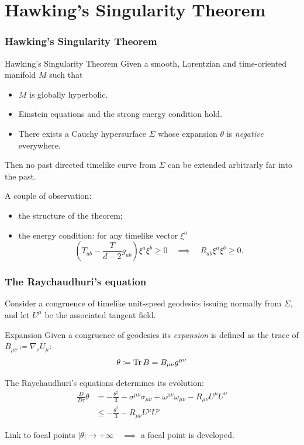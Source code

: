 \documentclass[]{beamer}
\begin{document}
\section{Hawking's Singularity Theorem}
\begin{frame}
	\frametitle{Hawking's Singularity Theorem}
	\begin{theoblock}{Hawking's Singularity Theorem \cite{wald2010general}}
		Given a smooth, Lorentzian and time-oriented manifold \(M\) such that 
		\begin{itemize}
			\item \(M\) is globally hyperbolic.
			\item Einstein equations and the strong energy condition hold.
			\item There exists a Cauchy hypersurface \(\Sigma\) whose expansion \(\theta\) is \emph{negative} everywhere.
		\end{itemize}
	Then no past directed timelike curve from \(\Sigma\) can be extended arbitrarly far into the past.
	\end{theoblock}

	\pause
	A couple of observation:
	\begin{itemize}
		\item<2-> the structure of the theorem;
		\item<3-> the energy condition: for any timelike vector \(\xi^a\) 
		{\small
			\[
		\left(T_{ab} - \frac{T}{d - 2}g_{ab}\right) \xi^a \xi^b \ge 0 \quad \implies \quad R_{ab} \xi^a \xi^b \ge 0.
		\]}
	\end{itemize}

\end{frame}
\begin{frame}
	\frametitle{The Raychaudhuri's equation}
	Consider a congruence of timelike unit-speed geodesics issuing normally from \(\Sigma\), and let \(U^{\mu}\) be the associated tangent field.
	\begin{defblock}{Expansion}
		Given a congruence of geodesics its \emph{expansion} is defined as the trace of \(B_{\mu\nu} \coloneqq \nabla_{\nu}U_{\mu}\):
		\[
		\theta \coloneqq \operatorname{Tr} B = B_{\mu\nu}g^{\mu\nu}
		\]
	\end{defblock}
\pause
The Raychaudhuri's equations determines its evolution:
{\small
\begin{align*}
	\frac{D}{D\tau} \theta &= -\frac{\theta^2}{3} -\sigma^{\mu\nu}\sigma_{\mu\nu} + \omega^{\mu\nu}\omega_{\mu\nu} - R_{\mu\nu}U^{\mu}U^{\nu} \\
	&\le -\frac{\theta^2}{3} - R_{\mu\nu}U^{\mu}U^{\nu}
\end{align*}}
\vskip -14pt
\pause
\begin{ideablock}{Link to focal points}
	\centering
	\(|\theta| \rightarrow +\infty\quad \implies\) a focal point is developed.
\end{ideablock}
\end{frame}
\end{document}
